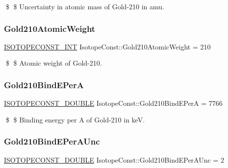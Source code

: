 \$ \$ Uncertainty in atomic mass of Gold-\/210 in amu. \mbox{\label{group___isotope_const-_gold-_au210_ga47c398882b4e9e13a329d811922395ff}} 
\subsubsection{\texorpdfstring{Gold210\+Atomic\+Weight}{Gold210AtomicWeight}}
{\footnotesize\ttfamily \mbox{\hyperlink{group___isotope_const-_macros_ga5f18360b3e99483a35c32d789e62621c}{I\+S\+O\+T\+O\+P\+E\+C\+O\+N\+S\+T\+\_\+\+I\+NT}} Isotope\+Const\+::\+Gold210\+Atomic\+Weight = 210}

\$ \$ Atomic weight of Gold-\/210. \mbox{\label{group___isotope_const-_gold-_au210_gac6ceec4b9f2eb9b73eca1f4e22804c1f}} 
\subsubsection{\texorpdfstring{Gold210\+Bind\+E\+PerA}{Gold210BindEPerA}}
{\footnotesize\ttfamily \mbox{\hyperlink{group___isotope_const-_macros_ga8f45a7272ce02c0b4c65c44636ed719a}{I\+S\+O\+T\+O\+P\+E\+C\+O\+N\+S\+T\+\_\+\+D\+O\+U\+B\+LE}} Isotope\+Const\+::\+Gold210\+Bind\+E\+PerA = 7766}

\$ \$ Binding energy per A of Gold-\/210 in keV. \mbox{\label{group___isotope_const-_gold-_au210_gaff3702507d9487c37f95101625ac9b35}} 
\subsubsection{\texorpdfstring{Gold210\+Bind\+E\+Per\+A\+Unc}{Gold210BindEPerAUnc}}
{\footnotesize\ttfamily \mbox{\hyperlink{group___isotope_const-_macros_ga8f45a7272ce02c0b4c65c44636ed719a}{I\+S\+O\+T\+O\+P\+E\+C\+O\+N\+S\+T\+\_\+\+D\+O\+U\+B\+LE}} Isotope\+Const\+::\+Gold210\+Bind\+E\+Per\+A\+Unc = 2}

